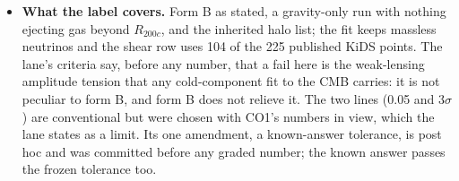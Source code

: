 \documentclass[10pt]{article}
\begin{document}
\begin{itemize}
\item \textbf{What the label covers.} Form B as stated, a gravity-only run with nothing ejecting gas beyond $R_{200c}$, and the inherited halo list; the fit keeps massless neutrinos and the shear row uses 104 of the 225 published KiDS points. The lane's criteria say, before any number, that a fail here is the weak-lensing amplitude tension that any cold-component fit to the CMB carries: it is not peculiar to form B, and form B does not relieve it. The two lines (0.05 and 3$\sigma$) are conventional but were chosen with CO1's numbers in view, which the lane states as a limit. Its one amendment, a known-answer tolerance, is post hoc and was committed before any graded number; the known answer passes the frozen tolerance too.
\end{itemize}
\end{document}

